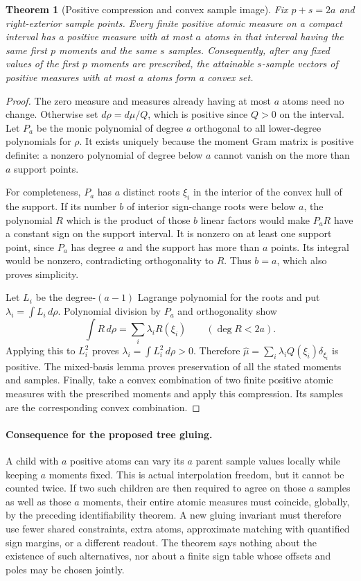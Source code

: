 \documentclass{article}
\newtheorem{theorem}{Theorem}
\begin{document}
\begin{theorem}[Positive compression and convex sample image]
Fix $p+s=2a$ and right-exterior sample points. Every finite positive
atomic measure on a compact interval has a positive measure with at
most $a$ atoms in that interval having the same first $p$ moments and
the same $s$ samples. Consequently, after any fixed values of the first
$p$ moments are prescribed, the attainable $s$-sample vectors of
positive measures with at most $a$ atoms form a convex set.
\end{theorem}
\begin{proof}
The zero measure and measures already having at most $a$ atoms need no
change. Otherwise set $d\rho=d\mu/Q$, which is positive since $Q>0$
on the interval. Let $P_a$ be the monic polynomial of degree $a$
orthogonal to all lower-degree polynomials for $\rho$. It exists
uniquely because the moment Gram matrix is positive definite: a
nonzero polynomial of degree below $a$ cannot vanish on the more than
$a$ support points.

For completeness, $P_a$ has $a$ distinct roots $\xi_i$ in the interior
of the convex hull of the support. If its number $b$ of interior
sign-change roots were below $a$, the polynomial $R$ which is the
product of those $b$ linear factors would make $P_aR$ have a constant
sign on the support interval. It is nonzero on at least one support
point, since $P_a$ has degree $a$ and the support has more than $a$
points. Its integral would be nonzero, contradicting orthogonality to
$R$. Thus $b=a$, which also proves simplicity.

Let $L_i$ be the degree-$(a-1)$ Lagrange polynomial for the roots and
put $\lambda_i=\int L_i\,d\rho$. Polynomial division by $P_a$ and
orthogonality show
\[
 \int R\,d\rho=\sum_i\lambda_iR(\xi_i)
 \qquad(\deg R<2a).
\]
Applying this to $L_i^2$ proves
$\lambda_i=\int L_i^2\,d\rho>0$. Therefore
$\widehat\mu=\sum_i\lambda_iQ(\xi_i)\delta_{\xi_i}$ is positive.
The mixed-basis lemma proves preservation of all the stated moments
and samples. Finally, take a convex combination of two finite positive
atomic measures with the prescribed moments and apply this compression.
Its samples are the corresponding convex combination.
\end{proof}

\paragraph{Consequence for the proposed tree gluing.}
A child with $a$ positive atoms can vary its $a$ parent sample values
locally while keeping $a$ moments fixed. This is actual interpolation
freedom, but it cannot be counted twice. If two such children are then
required to agree on those $a$ samples as well as those $a$ moments,
their entire atomic measures must coincide, globally, by the preceding
identifiability theorem. A new gluing invariant must therefore use fewer
shared constraints, extra atoms, approximate matching with quantified
sign margins, or a different readout. The theorem says nothing about
the existence of such alternatives, nor about a finite sign table
whose offsets and poles may be chosen jointly.
\end{document}
